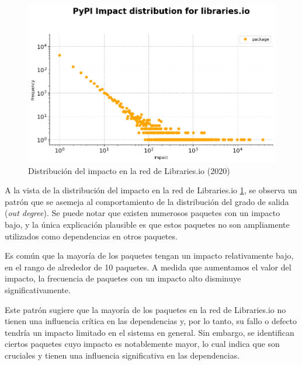 \begin{figure}[ht!]
    \begin{center}
        \includegraphics[width=1\textwidth]{img/pypi/librariesio_impact_distribution.png}
        \caption{Distribución del impacto en la red de Libraries.io (2020)}
        \label{fig:Distribución del impacto en la red de Libraries.io}
    \end{center}
\end{figure}

A la vista de la distribución del impacto en la red de Libraries.io \ref{fig:Distribución del impacto en la red de Libraries.io}, se observa un patrón que se
asemeja al comportamiento de la distribución del grado de salida (\textit{out degree}). Se puede notar
que existen numerosos paquetes con un impacto bajo, y la única explicación plausible es que estos paquetes
no son ampliamente utilizados como dependencias en otros paquetes.

Es común que la mayoría de los paquetes tengan un impacto relativamente bajo, en el rango de alrededor
de 10 paquetes. A medida que aumentamos el valor del impacto, la frecuencia de paquetes con un impacto
alto disminuye significativamente.

Este patrón sugiere que la mayoría de los paquetes en la red de Libraries.io no tienen una influencia
crítica en las dependencias y, por lo tanto, su fallo o defecto tendría un impacto limitado en el
sistema en general. Sin embargo, se
identifican ciertos paquetes cuyo impacto es notablemente mayor, lo cual indica que son cruciales
y tienen una influencia significativa en las dependencias.

